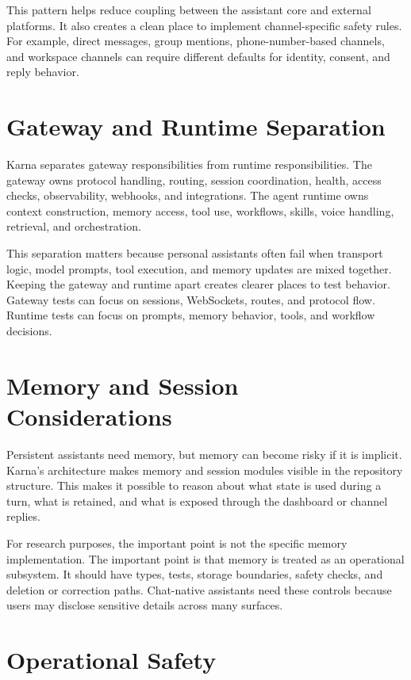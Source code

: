 \documentclass[11pt]{article}
\begin{document}
This pattern helps reduce coupling between the assistant core and external platforms. It also creates a clean place to implement channel-specific safety rules. For example, direct messages, group mentions, phone-number-based channels, and workspace channels can require different defaults for identity, consent, and reply behavior.

\section{Gateway and Runtime Separation}

Karna separates gateway responsibilities from runtime responsibilities. The gateway owns protocol handling, routing, session coordination, health, access checks, observability, webhooks, and integrations. The agent runtime owns context construction, memory access, tool use, workflows, skills, voice handling, retrieval, and orchestration.

This separation matters because personal assistants often fail when transport logic, model prompts, tool execution, and memory updates are mixed together. Keeping the gateway and runtime apart creates clearer places to test behavior. Gateway tests can focus on sessions, WebSockets, routes, and protocol flow. Runtime tests can focus on prompts, memory behavior, tools, and workflow decisions.

\section{Memory and Session Considerations}

Persistent assistants need memory, but memory can become risky if it is implicit. Karna’s architecture makes memory and session modules visible in the repository structure. This makes it possible to reason about what state is used during a turn, what is retained, and what is exposed through the dashboard or channel replies.

For research purposes, the important point is not the specific memory implementation. The important point is that memory is treated as an operational subsystem. It should have types, tests, storage boundaries, safety checks, and deletion or correction paths. Chat-native assistants need these controls because users may disclose sensitive details across many surfaces.

\section{Operational Safety}
\end{document}
